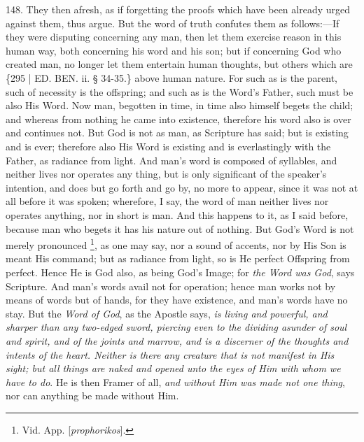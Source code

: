 148. They then afresh, as if
forgetting the proofs which have been already urged against them, thus
argue. But the word of truth confutes them as follows:—If they were
disputing concerning any man, then let them exercise reason in this
human way, both concerning his word and his son; but if concerning God
who created man, no longer let them entertain human thoughts, but
others which are \{295 | ED.
BEN.
ii. § 34-35.\} above human nature. For such as is the parent, such of
necessity is the offspring; and such as is the Word's Father, such
must be also His Word. Now man, begotten in time, in time also himself
begets the child; and whereas from nothing he came into existence,
therefore his word also is over and continues not. But God is not as
man, as Scripture has said; but is existing and is ever; therefore
also His Word is existing and is everlastingly with the Father, as
radiance from light. And man's word is composed of syllables, and
neither lives nor operates any thing, but is only significant of the
speaker's intention, and does but go forth and go by, no more to
appear, since it was not at all before it was spoken; wherefore, I
say, the word of man neither lives nor operates anything, nor in short
is man. And this happens to it, as I said before, because man who
begets it has his nature out of nothing. But God's Word is not merely
pronounced \footnote{Vid. App. [\emph{prophorikos}].}, as one may
say, nor a sound of accents, nor by His Son is meant His command; but
as radiance from light, so is He perfect Offspring from perfect. Hence
He is God also, as being God's Image; for \emph{the Word was God},
says Scripture. And man's words avail not for operation; hence man
works not by means of words but of hands, for they have existence, and
man's words have no stay. But the \emph{Word of God}, as the Apostle
says, \emph{is living and powerful, and sharper than any two-edged sword,
piercing even to the dividing asunder of soul and spirit, and of the
joints and marrow, and is a discerner of the thoughts and intents of
the heart. Neither is there any creature that is not manifest in His
sight; but all things are naked and opened unto the eyes of Him with
whom we have to do}. He is then Framer of all, \emph{and without Him
was made not one thing}, nor can anything be made without Him.


